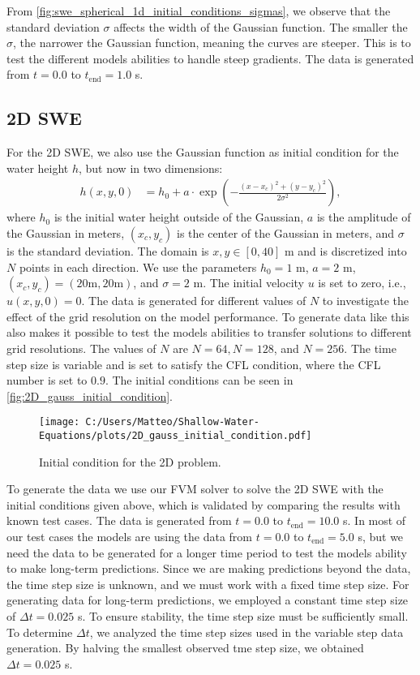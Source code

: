From \autoref{fig:swe_spherical_1d_initial_conditions_sigmas}, we observe that the standard deviation \(\sigma\) affects the width of the Gaussian function.
The smaller the $\sigma$, the narrower the Gaussian function, meaning the curves are steeper.
This is to test the different models abilities to handle steep gradients.
The data is generated from $t = 0.0$ to $t_{\text{end}} = 1.0$ s.

\subsection*{2D SWE}
For the 2D SWE, we also use the Gaussian function as initial condition for the water height $h$, but now in two dimensions:
\begin{align}\label{eq:2D_swe_ic_gaussian}
    h(x,y,0) &= h_0 + a \cdot \exp \left( -\frac{{(x-x_c)}^2 + {(y-y_c)}^2}{2\sigma^2} \right), 
\end{align}
where $h_0$ is the initial water height outside of the Gaussian, $a$ is the amplitude of the Gaussian in meters, $(x_c, y_c)$ is the center of the Gaussian in meters, and $\sigma$ is the standard deviation.
The domain is $x,y \in [0,40]$ m and is discretized into $N$ points in each direction.
We use the parameters $h_0 = 1$ m, $a = 2$ m, $(x_c, y_c) = (20 \text{m}, 20 \text{m})$, and $\sigma = 2$ m.
The initial velocity $u$ is set to zero, i.e., $u(x,y,0) = 0$.
The data is generated for different values of $N$ to investigate the effect of the grid resolution on the model performance.
To generate data like this also makes it possible to test the models abilities to transfer solutions to different grid resolutions.
The values of $N$ are $N = 64, N = 128$, and $N = 256$.
The time step size is variable and is set to satisfy the CFL condition, where the CFL number is set to $0.9$.
The initial conditions can be seen in \autoref{fig:2D_gauss_initial_condition}.
\begin{figure}[H]
    \centering
    \texttt{[image: C:/Users/Matteo/Shallow-Water-Equations/plots/2D\_gauss\_initial\_condition.pdf]}
    \caption{Initial condition for the 2D problem.}\label{fig:2D_gauss_initial_condition}
\end{figure}
To generate the data we use our FVM solver to solve the 2D SWE with the initial conditions given above, which is validated by comparing the results with known test cases.
The data is generated from $t = 0.0$ to $t_{\text{end}} = 10.0$ s.
In most of our test cases the models are using the data from $t = 0.0$ to $t_{\text{end}} = 5.0$ s, but we need the data to be generated for a longer time period to test the models ability to make long-term predictions.
Since we are making predictions beyond the data, the time step size is unknown, and we must work with a fixed time step size.
For generating data for long-term predictions, we employed a constant time step size of $\Delta t = 0.025$ s.
To ensure stability, the time step size must be sufficiently small.
To determine $\Delta t$, we analyzed the time step sizes used in the variable step data generation. 
By halving the smallest observed tme step size, we obtained $\Delta t = 0.025$ s.


